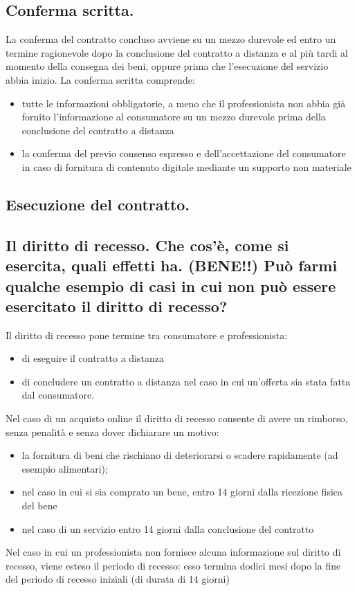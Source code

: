 \subsection{Conferma scritta.}
La conferma del contratto concluso avviene su un mezzo durevole ed entro un termine ragionevole dopo la conclusione del contratto a distanza e al più tardi al momento della consegna dei beni, oppure prima che l'esecuzione del servizio abbia inizio.
\newline
La conferma scritta comprende:
\begin{itemize}
    \item tutte le informazioni obbligatorie, a meno che il professionista non abbia già fornito l'informazione al consumatore su un mezzo durevole prima della conclusione del contratto a distanza
    \item la conferma del previo consenso espresso e dell'accettazione del consumatore in caso di fornitura di contenuto digitale mediante un supporto non materiale
\end{itemize}

\subsection{Esecuzione del contratto.}
\subsection{Il diritto di recesso. Che cos’è, come si esercita, quali effetti ha. (BENE!!)
Può farmi qualche esempio di casi in cui non può essere esercitato il diritto di recesso?}

Il diritto di recesso pone termine tra consumatore e professionista:
\begin{itemize}
    \item di eseguire il contratto a distanza
    \item di concludere un contratto a distanza nel caso in cui un'offerta sia stata fatta dal consumatore.
\end{itemize}
Nel caso di un acquisto online il diritto di recesso consente di avere un rimborso, senza penalità e senza dover dichiarare un motivo:
\begin{itemize}
    \item la fornitura di beni che rischiano di deteriorarsi o scadere rapidamente (ad esempio alimentari);
    \item nel caso in cui si sia comprato un bene, entro 14 giorni dalla ricezione fisica del bene
    \item nel caso di un servizio entro 14 giorni dalla conclusione del contratto
\end{itemize}
Nel caso in cui un professionista non fornisce alcuna informazione sul diritto di recesso, viene esteso il periodo di recesso: esso termina dodici mesi dopo la fine del periodo di recesso iniziali (di durata di 14 giorni)

